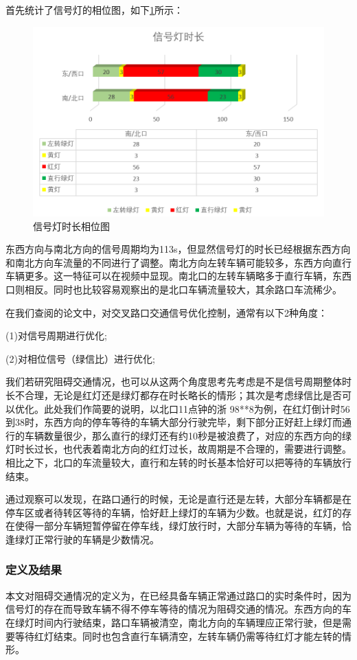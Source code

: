 首先统计了信号灯的相位图，如下\ref{fig:p10}所示：
\begin{figure}[H]
    \centering
    \includegraphics[scale=0.7]{figures/信号灯时长相位图.png}
    \caption{信号灯时长相位图}
    \label{fig:p10}
\end{figure}

东西方向与南北方向的信号周期均为113s，但显然信号灯的时长已经根据东西方向和南北方向车流量的不同进行了调整。南北方向左转车辆可能较多，东西方向直行车辆更多。这一特征可以在视频中显现。南北口的左转车辆略多于直行车辆，东西口则相反。同时也比较容易观察出的是北口车辆流量较大，其余路口车流稀少。

在我们查阅的论文中，对交叉路口交通信号优化控制，通常有以下2种角度：

(1)对信号周期进行优化;

(2)对相位信号（绿信比）进行优化;

我们若研究阻碍交通情况，也可以从这两个角度思考先考虑是不是信号周期整体时长不合理，无论是红灯还是绿灯都存在时长略长的情形；其次是考虑绿信比是否可以优化。此处我们作简要的说明，以北口11点钟的浙 98**8为例，在红灯倒计时56到38时，东西方向的停车等待的车辆大部分行驶完毕，剩下部分正好赶上绿灯而通行的车辆数量很少，那么直行的绿灯还有约10秒是被浪费了，对应的东西方向的绿灯时长过长，也代表着南北方向的红灯过长，故周期是不合理的，需要进行调整。相比之下，北口的车流量较大，直行和左转的时长基本恰好可以把等待的车辆放行结束。

通过观察可以发现，在路口通行的时候，无论是直行还是左转，大部分车辆都是在停车区或者待转区等待的车辆，恰好赶上绿灯的车辆为少数。也就是说，红灯的存在使得一部分车辆短暂停留在停车线，绿灯放行时，大部分车辆为等待的车辆，恰逢绿灯正常行驶的车辆是少数情况。

\subsubsection{定义及结果}
本文对阻碍交通情况的定义为，在已经具备车辆正常通过路口的实时条件时，因为信号灯的存在而导致车辆不得不停车等待的情况为阻碍交通的情况。东西方向的车在绿灯时间内行驶结束，路口车辆被清空，南北方向的车辆理应正常行驶，但是需要等待红灯结束。同时也包含直行车辆清空，左转车辆仍需等待红灯才能左转的情形。


